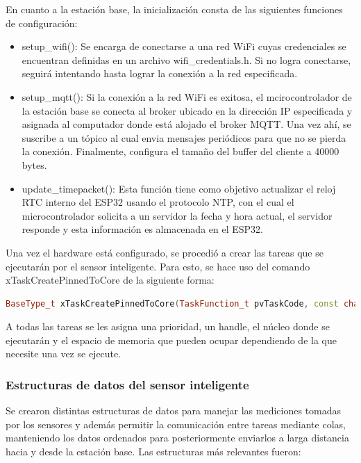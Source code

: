 En cuanto a la estación base, la inicialización consta de las siguientes funciones de configuración:

\begin{itemize}
    \item setup\_wifi(): Se encarga de conectarse a una red WiFi cuyas credenciales se encuentran definidas en un archivo wifi\_credentials.h. Si no logra conectarse, seguirá intentando hasta lograr la conexión a la red especificada.
    \item setup\_mqtt(): Si la conexión a la red WiFi es exitosa, el mcirocontrolador de la estación base se conecta al broker ubicado en la dirección IP especificada y asignada al computador donde está alojado el broker MQTT. Una vez ahí, se suscribe a un tópico al cual envia mensajes periódicos para que no se pierda la conexión. Finalmente, configura el tamaño del buffer del cliente a 40000 bytes.
    \item update\_timepacket(): Esta función tiene como objetivo actualizar el reloj RTC interno del ESP32 usando el protocolo NTP, con el cual el microcontrolador solicita a un servidor la fecha y hora actual, el servidor responde y esta información es almacenada en el ESP32.
\end{itemize}

Una vez el hardware está configurado, se procedió a crear las tareas que se ejecutarán por el sensor inteligente. Para esto, se hace uso del comando xTaskCreatePinnedToCore de la siguiente forma:

\begin{lstlisting}[language=C++, caption=Creación de tareas en FreeRTOS]
    BaseType_t xTaskCreatePinnedToCore(TaskFunction_t pvTaskCode, const char * const pcName, const uint32_t usStackDepth, void * const pvParameters, UBaseType_t uxPriority, TaskHandle_t * const pvCreatedTask, const BaseType_t xCoreID);    
\end{lstlisting}

A todas las tareas se les asigna una prioridad, un handle, el núcleo donde se ejecutarán y el espacio de memoria que pueden  ocupar dependiendo de la que necesite una vez se ejecute. 

\subsubsection{Estructuras de datos del sensor inteligente}

Se crearon distintas estructuras de datos para manejar las mediciones tomadas por los sensores y además permitir la comunicación entre tareas mediante colas, manteniendo los datos ordenados para posteriormente  enviarlos a larga distancia hacia y desde la estación base. Las estructuras más relevantes fueron:

